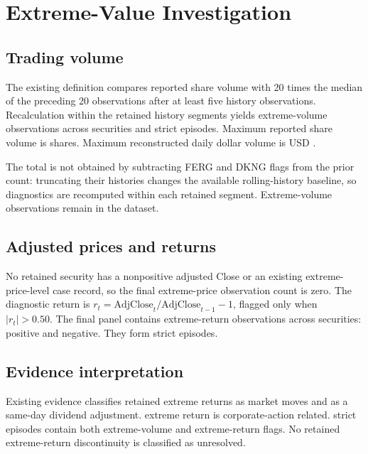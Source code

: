 \section{Extreme-Value Investigation}

\subsection{Trading volume}

The existing definition compares reported share volume with 20 times the
median of the preceding 20 observations after at least five history
observations. Recalculation within the retained history segments yields
\FinalExtremeVolumeRows{} extreme-volume observations across
\FinalExtremeVolumeSecurities{} securities and \FinalExtremeVolumeEpisodes{}
strict episodes. Maximum reported share volume is
\FinalExtremeVolumeMaxShares{} shares. Maximum reconstructed daily dollar
volume is USD \FinalExtremeVolumeMaxDollar{}.

The total is not obtained by subtracting FERG and DKNG flags from the prior
count: truncating their histories changes the available rolling-history
baseline, so diagnostics are recomputed within each retained segment.
Extreme-volume observations remain in the dataset.

\subsection{Adjusted prices and returns}

No retained security has a nonpositive adjusted Close or an existing
extreme-price-level case record, so the final extreme-price observation count is
zero. The diagnostic return is
\(r_t=\mathrm{AdjClose}_t/\mathrm{AdjClose}_{t-1}-1\), flagged only when
\(|r_t|>0.50\). The final panel contains \FinalExtremeReturnRows{}
extreme-return observations across \FinalExtremeReturnSecurities{} securities:
\FinalExtremeReturnPositive{} positive and \FinalExtremeReturnNegative{}
negative. They form \FinalExtremeReturnEpisodes{} strict episodes.

\begin{table}[H]
\centering
\caption{Recomputed extreme-value summary}
\label{tab:extreme-summary}
\end{table}


\subsection{Evidence interpretation}

Existing evidence classifies \RetainedExtremeMarketMoves{} retained extreme
returns as market moves and \SameDayDividendAdjustmentCases{} as a same-day
dividend adjustment. \CorporateActionExtremeReturns{} extreme return is
corporate-action related. \OverlappingVolumeReturnEpisodes{} strict episodes
contain both extreme-volume and
extreme-return flags. No retained extreme-return discontinuity is classified as
unresolved.

